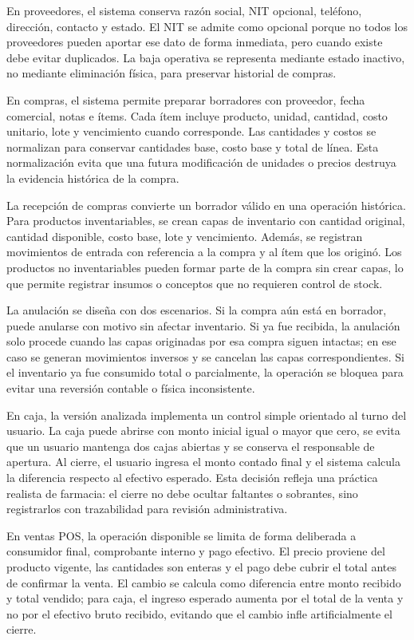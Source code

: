 En proveedores, el sistema conserva razón social, NIT opcional, teléfono, dirección, contacto y estado. El NIT se admite como opcional porque no todos los proveedores pueden aportar ese dato de forma inmediata, pero cuando existe debe evitar duplicados. La baja operativa se representa mediante estado inactivo, no mediante eliminación física, para preservar historial de compras.

En compras, el sistema permite preparar borradores con proveedor, fecha comercial, notas e ítems. Cada ítem incluye producto, unidad, cantidad, costo unitario, lote y vencimiento cuando corresponde. Las cantidades y costos se normalizan para conservar cantidades base, costo base y total de línea. Esta normalización evita que una futura modificación de unidades o precios destruya la evidencia histórica de la compra.

La recepción de compras convierte un borrador válido en una operación histórica. Para productos inventariables, se crean capas de inventario con cantidad original, cantidad disponible, costo base, lote y vencimiento. Además, se registran movimientos de entrada con referencia a la compra y al ítem que los originó. Los productos no inventariables pueden formar parte de la compra sin crear capas, lo que permite registrar insumos o conceptos que no requieren control de stock.

La anulación se diseña con dos escenarios. Si la compra aún está en borrador, puede anularse con motivo sin afectar inventario. Si ya fue recibida, la anulación solo procede cuando las capas originadas por esa compra siguen intactas; en ese caso se generan movimientos inversos y se cancelan las capas correspondientes. Si el inventario ya fue consumido total o parcialmente, la operación se bloquea para evitar una reversión contable o física inconsistente.

En caja, la versión analizada implementa un control simple orientado al turno del usuario. La caja puede abrirse con monto inicial igual o mayor que cero, se evita que un usuario mantenga dos cajas abiertas y se conserva el responsable de apertura. Al cierre, el usuario ingresa el monto contado final y el sistema calcula la diferencia respecto al efectivo esperado. Esta decisión refleja una práctica realista de farmacia: el cierre no debe ocultar faltantes o sobrantes, sino registrarlos con trazabilidad para revisión administrativa.

En ventas POS, la operación disponible se limita de forma deliberada a consumidor final, comprobante interno y pago efectivo. El precio proviene del producto vigente, las cantidades son enteras y el pago debe cubrir el total antes de confirmar la venta. El cambio se calcula como diferencia entre monto recibido y total vendido; para caja, el ingreso esperado aumenta por el total de la venta y no por el efectivo bruto recibido, evitando que el cambio infle artificialmente el cierre.

